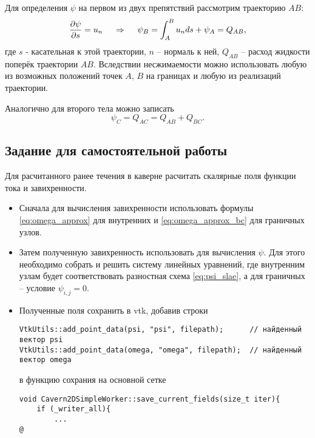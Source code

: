 Для определения $\psi$ на первом из двух препятствий рассмотрим траекторию $AB$:
\begin{equation*}
    \frac{\partial \psi}{\partial s} = u_n \; \quad\Rightarrow\quad \; \psi_B = \int_A^B u_n ds + \psi_A = Q_{AB},
\end{equation*}
где $s$ - касательная к этой траектории, $n$ -- нормаль к ней, $Q_{AB}$ -- расход
жидкости поперёк траектории $AB$. Вследствии несжимаемости можно
использовать любую из возможных положений точек $A$, $B$ на границах и любую из реализаций траектории.

Аналогично для второго тела можно записать
\begin{equation*}
    \psi_C = Q_{AC} = Q_{AB} + Q_{BC}.
\end{equation*}

\subsection{Задание для самостоятельной работы}

Для расчитанного ранее течения в каверне расчитать скалярные поля функции тока и завихренности.

\begin{itemize}
\item
Сначала для вычисления завихренности использовать формулы
\eqref{eq:omega_approx} для внутренних
и \eqref{eq:omega_approx_bc} для граничных узлов.
\item
Затем полученную завихренность использовать для вычисления $\psi$.
Для этого необходимо собрать и решить систему линейных уравнений, где внутренним узлам
будет соответствовать разностная схема \eqref{eq:psi_slae},
а для граничных -- условие $\psi_{i,j} = 0$. 
\item
Полученные поля сохранить в vtk, добавив
строки
\begin{verbatim}
VtkUtils::add_point_data(psi, "psi", filepath);      // найденный вектор psi
VtkUtils::add_point_data(omega, "omega", filepath);  // найденный вектор omega
\end{verbatim}
в функцию сохрания на основной сетке 
\begin{verbatim}
void Cavern2DSimpleWorker::save_current_fields(size_t iter){
    if (_writer_all){
        ...
@\end{verbatim}
\end{itemize}
